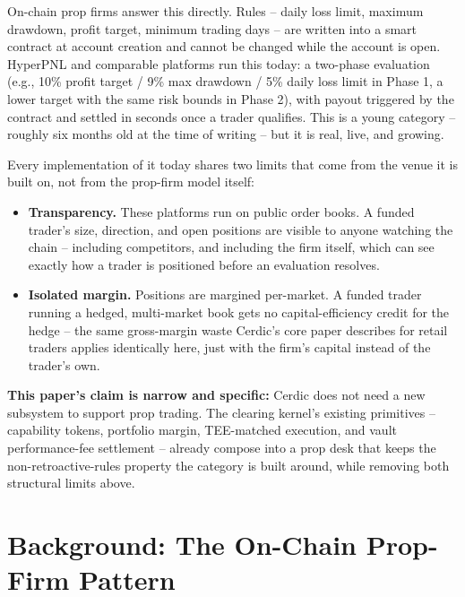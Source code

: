 \documentclass[11pt,a4paper]{article}
\begin{document}
On-chain prop firms answer this directly. Rules -- daily loss limit, maximum drawdown,
profit target, minimum trading days -- are written into a smart contract at account
creation and cannot be changed while the account is open. HyperPNL and comparable platforms
run this today: a two-phase evaluation (e.g., 10\% profit target / 9\% max drawdown / 5\%
daily loss limit in Phase 1, a lower target with the same risk bounds in Phase 2), with
payout triggered by the contract and settled in seconds once a trader qualifies. This is a
young category -- roughly six months old at the time of writing -- but it is real, live,
and growing.

Every implementation of it today shares two limits that come from the venue it is built on,
not from the prop-firm model itself:

\begin{itemize}
  \item \textbf{Transparency.} These platforms run on public order books. A funded trader's
  size, direction, and open positions are visible to anyone watching the chain -- including
  competitors, and including the firm itself, which can see exactly how a trader is
  positioned before an evaluation resolves.
  \item \textbf{Isolated margin.} Positions are margined per-market. A funded trader running
  a hedged, multi-market book gets no capital-efficiency credit for the hedge -- the same
  gross-margin waste Cerdic's core paper describes for retail traders applies identically
  here, just with the firm's capital instead of the trader's own.
\end{itemize}

\textbf{This paper's claim is narrow and specific:} Cerdic does not need a new subsystem to
support prop trading. The clearing kernel's existing primitives -- capability tokens,
portfolio margin, TEE-matched execution, and vault performance-fee settlement -- already
compose into a prop desk that keeps the non-retroactive-rules property the category is
built around, while removing both structural limits above.

\section{Background: The On-Chain Prop-Firm Pattern}
\label{sec:background}
\end{document}
